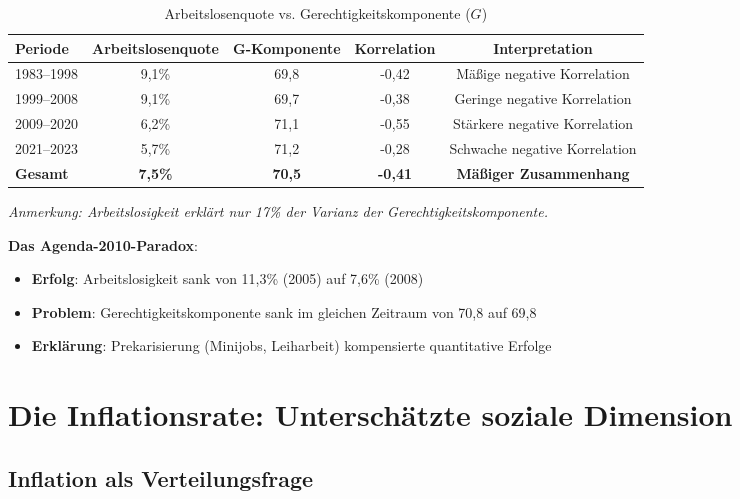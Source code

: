 \begin{table}[ht]
    \centering
    \caption{Arbeitslosenquote vs. Gerechtigkeitskomponente (\(G\))}
    \label{tab:arbeitslosigkeit_gerechtigkeit}
    \begin{tabular}{lcccc}
        \toprule
        \textbf{Periode} & \textbf{Arbeitslosenquote} & \textbf{G-Komponente} & \textbf{Korrelation} & \textbf{Interpretation} \\
        \midrule
        1983–1998 & 9,1\% & 69,8 & -0,42 & Mäßige negative Korrelation \\
        1999–2008 & 9,1\% & 69,7 & -0,38 & Geringe negative Korrelation \\
        2009–2020 & 6,2\% & 71,1 & -0,55 & Stärkere negative Korrelation \\
        2021–2023 & 5,7\% & 71,2 & -0,28 & Schwache negative Korrelation \\
        \midrule
        \textbf{Gesamt} & \textbf{7,5\%} & \textbf{70,5} & \textbf{-0,41} & \textbf{Mäßiger Zusammenhang} \\
        \bottomrule
    \end{tabular}
\end{table}

\begin{flushleft}
\footnotesize{\textit{Anmerkung: Arbeitslosigkeit erklärt nur 17\% der Varianz der Gerechtigkeitskomponente.}}
\end{flushleft}

\textbf{Das Agenda-2010-Paradox}:

\begin{itemize}
    \item \textbf{Erfolg}: Arbeitslosigkeit sank von 11,3\% (2005) auf 7,6\% (2008)
    \item \textbf{Problem}: Gerechtigkeitskomponente sank im gleichen Zeitraum von 70,8 auf 69,8
    \item \textbf{Erklärung}: Prekarisierung (Minijobs, Leiharbeit) kompensierte quantitative Erfolge
\end{itemize}

\section{Die Inflationsrate: Unterschätzte soziale Dimension}

\subsection{Inflation als Verteilungsfrage}

